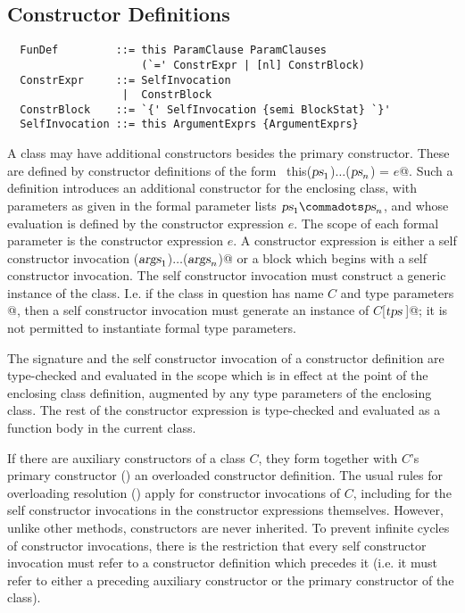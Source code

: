 \subsection{Constructor Definitions}\label{sec:constr-defs}

\syntax\begin{lstlisting}
  FunDef         ::= this ParamClause ParamClauses 
                     (`=' ConstrExpr | [nl] ConstrBlock)
  ConstrExpr     ::= SelfInvocation
                  |  ConstrBlock
  ConstrBlock    ::= `{' SelfInvocation {semi BlockStat} `}'
  SelfInvocation ::= this ArgumentExprs {ArgumentExprs}
\end{lstlisting}

A class may have additional constructors besides the primary
constructor.  These are defined by constructor definitions of the form
~\lstinline@def this($\mbox{\sl ps}_1$)$\ldots$($\mbox{\sl ps}_n$) = $e$@.  Such a
definition introduces an additional constructor for the enclosing
class, with parameters as given in the formal parameter lists $\ps_1
\commadots \ps_n$, and whose evaluation is defined by the constructor
expression $e$.  The scope of each formal parameter is the constructor
expression $e$.  A constructor expression is either a self constructor
invocation \lstinline@this($\mbox{\sl args}_1$)$\ldots$($\mbox{\sl args}_n$)@ or a block
which begins with a self constructor invocation. The self constructor
invocation must construct a generic instance of the class. I.e. if the
class in question has name $C$ and type parameters
\lstinline@[$\tps\,$]@, then a self constructor invocation must
generate an instance of \lstinline@$C$[$\tps\,$]@; it is not permitted
to instantiate formal type parameters.

The signature and the self constructor invocation of a constructor
definition are type-checked and evaluated in the scope which is in
effect at the point of the enclosing class definition, augmented by
any type parameters of the enclosing class. The rest of the
constructor expression is type-checked and evaluated as a function
body in the current class.
  
If there are auxiliary constructors of a class $C$, they form together
with $C$'s primary constructor ()
an overloaded constructor
definition. The usual rules for overloading resolution
() apply for constructor invocations of $C$,
including for the self constructor invocations in the constructor
expressions themselves. However, unlike other methods, constructors
are never inherited.  To prevent infinite cycles of constructor
invocations, there is the restriction that every self constructor
invocation must refer to a constructor definition which precedes it
(i.e. it must refer to either a preceding auxiliary constructor or the
primary constructor of the class).  

